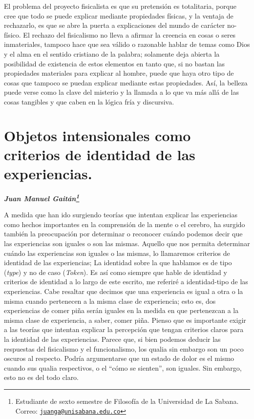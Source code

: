 \documentclass[]{book}
\newcommand{\autor}[1]{            %
  \begin{center}                   %
    \vspace*{-3.5em}               %
    \textbf{\textit{\large #1}}    %
    \vspace*{+4em}                 %
  \end{center}
}
\begin{document}
\begin{refsection}
El problema del proyecto fisicalista es que su pretensión es
totalitaria, porque cree que todo se puede explicar mediante propiedades
físicas, y la ventaja de rechazarlo, es que se abre la puerta a
explicaciones del mundo de carácter no-físico. El rechazo del
fisicalismo no lleva a afirmar la creencia en cosas o seres
inmateriales, tampoco hace que sea válido o razonable hablar de temas
como Dios y el alma en el sentido cristiano de la palabra; solamente
deja abierta la posibilidad de existencia de estos elementos en tanto
que, si no bastan las propiedades materiales para explicar al hombre,
puede que haya otro tipo de cosas que tampoco se puedan explicar
mediante estas propiedades. Así, la belleza puede verse como la clave
del misterio y la llamada a lo que va más allá de las cosas tangibles y
que caben en la lógica fría y discursiva.


\nocite{BarriosRuiz2014}
\nocite{Dennett2003}
\nocite{Murray1979}
\nocite{Nagel1965}
\nocite{RomeraSF}

\printbibliography[heading=subbibliography,title={Referencias}]

\end{refsection}


\chapter{\texorpdfstring{\textbf{Objetos intensionales como criterios de
identidad de las
experiencias.}}{Objetos intensionales como criterios de identidad de las experiencias.}}\label{objetos-intensionales-como-criterios-de-identidad-de-las-experiencias.}

\autor{Juan Manuel Gaitán\footnote{Estudiante de sexto semestre de
  Filosofía de la Universidad de La Sabana. Correo:
  \href{mailto:juanga@unisabana.edu.co}{\nolinkurl{juanga@unisabana.edu.co}}}}

A medida que han ido surgiendo teorías que intentan explicar las
experiencias como hechos importantes en la comprensión de la mente o el
cerebro, ha surgido también la preocupación por determinar o reconocer
cuándo podemos decir que las experiencias son iguales o son las mismas.
Aquello que nos permita determinar cuándo las experiencias son iguales o
las mismas, lo llamaremos criterios de identidad de las experiencias; La
identidad sobre la que hablamos es de tipo (\emph{type}) y no de caso
(\emph{Token}). Es así como siempre que hable de identidad y criterios
de identidad a lo largo de este escrito, me referiré a identidad-tipo de
las experiencias. Cabe resaltar que decimos que una experiencia es igual
a otra o la misma cuando pertenecen a la misma clase de experiencia;
esto es, dos experiencias de comer piña serán iguales en la medida en
que pertenezcan a la misma clase de experiencia, a saber, comer piña.
Pienso que es importante exigir a las teorías que intentan explicar la
percepción que tengan criterios claros para la identidad de las
experiencias. Parece que, si bien podemos deducir las respuestas del
fisicalismo y el funcionalismo, los qualia sin embargo son un poco
oscuros al respecto. Podría argumentarse que un estado de dolor es el
mismo cuando sus qualia respectivos, o el ``cómo se sienten'', son
iguales. Sin embargo, esto no es del todo claro.
\end{document}
